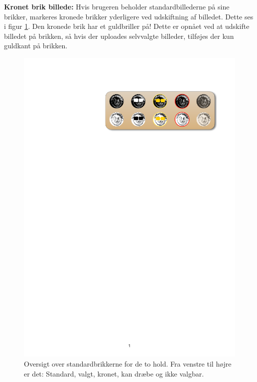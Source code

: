 \textbf{Kronet brik billede:} Hvis brugeren beholder standardbillederne på sine brikker, markeres kronede brikker yderligere ved udskiftning af billedet. Dette ses i figur \ref{fig:defaultPieces}. Den kronede brik har et guldbriller på! Dette er opnået ved at udskifte billedet på brikken, så hvis der uploades selvvalgte billeder, tilføjes der kun guldkant på brikken.  \\

\begin{figure}[H]
    \centering
    \includegraphics[width = 1.0\textwidth]{Figurer/DefaultPieces}
    \caption{Oversigt over standardbrikkerne for de to hold. Fra venstre til højre er det: Standard, valgt, kronet, kan dræbe og ikke valgbar.}
    \label{fig:defaultPieces}
    \end{figure}

